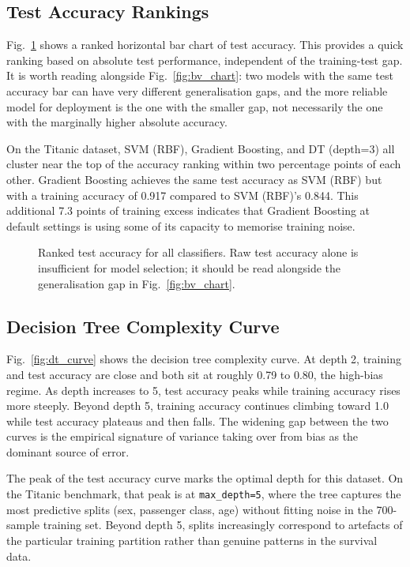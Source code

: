 \documentclass[conference]{IEEEtran}
\begin{document}
\subsection{Test Accuracy Rankings}

Fig.~\ref{fig:acc_ranking} shows a ranked horizontal bar chart of test accuracy. This provides a quick ranking based on absolute test performance, independent of the training-test gap. It is worth reading alongside Fig.~\ref{fig:bv_chart}: two models with the same test accuracy bar can have very different generalisation gaps, and the more reliable model for deployment is the one with the smaller gap, not necessarily the one with the marginally higher absolute accuracy.

On the Titanic dataset, SVM (RBF), Gradient Boosting, and DT (depth=3) all cluster near the top of the accuracy ranking within two percentage points of each other. Gradient Boosting achieves the same test accuracy as SVM (RBF) but with a training accuracy of 0.917 compared to SVM (RBF)'s 0.844. This additional 7.3 points of training excess indicates that Gradient Boosting at default settings is using some of its capacity to memorise training noise.

\begin{figure}[t]
    \centering
    \caption{Ranked test accuracy for all classifiers. Raw test accuracy alone is insufficient for model selection; it should be read alongside the generalisation gap in Fig.~\ref{fig:bv_chart}.}
    \label{fig:acc_ranking}
\end{figure}

\subsection{Decision Tree Complexity Curve}

Fig.~\ref{fig:dt_curve} shows the decision tree complexity curve. At depth 2, training and test accuracy are close and both sit at roughly 0.79 to 0.80, the high-bias regime. As depth increases to 5, test accuracy peaks while training accuracy rises more steeply. Beyond depth 5, training accuracy continues climbing toward 1.0 while test accuracy plateaus and then falls. The widening gap between the two curves is the empirical signature of variance taking over from bias as the dominant source of error.

The peak of the test accuracy curve marks the optimal depth for this dataset. On the Titanic benchmark, that peak is at \texttt{max\_depth=5}, where the tree captures the most predictive splits (sex, passenger class, age) without fitting noise in the 700-sample training set. Beyond depth 5, splits increasingly correspond to artefacts of the particular training partition rather than genuine patterns in the survival data.
\end{document}
